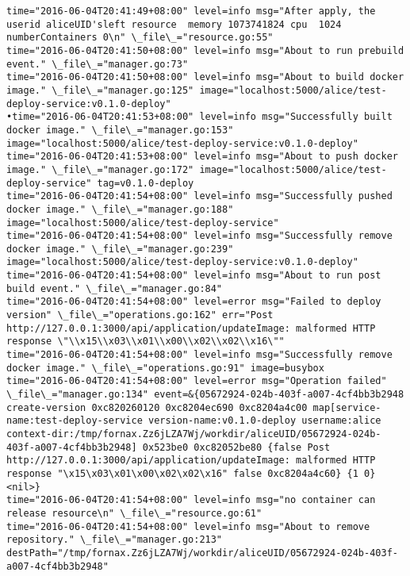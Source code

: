 \begin{lstlisting}[caption={Fornax功能性测试日志}]
time="2016-06-04T20:41:49+08:00" level=info msg="After apply, the userid aliceUID'sleft resource  memory 1073741824 cpu  1024 numberContainers 0\n" \_file\_="resource.go:55" 
time="2016-06-04T20:41:50+08:00" level=info msg="About to run prebuild event." \_file\_="manager.go:73" 
time="2016-06-04T20:41:50+08:00" level=info msg="About to build docker image." \_file\_="manager.go:125" image="localhost:5000/alice/test-deploy-service:v0.1.0-deploy" 
•time="2016-06-04T20:41:53+08:00" level=info msg="Successfully built docker image." \_file\_="manager.go:153" image="localhost:5000/alice/test-deploy-service:v0.1.0-deploy" 
time="2016-06-04T20:41:53+08:00" level=info msg="About to push docker image." \_file\_="manager.go:172" image="localhost:5000/alice/test-deploy-service" tag=v0.1.0-deploy 
time="2016-06-04T20:41:54+08:00" level=info msg="Successfully pushed docker image." \_file\_="manager.go:188" image="localhost:5000/alice/test-deploy-service" 
time="2016-06-04T20:41:54+08:00" level=info msg="Successfully remove docker image." \_file\_="manager.go:239" image="localhost:5000/alice/test-deploy-service:v0.1.0-deploy" 
time="2016-06-04T20:41:54+08:00" level=info msg="About to run post build event." \_file\_="manager.go:84" 
time="2016-06-04T20:41:54+08:00" level=error msg="Failed to deploy version" \_file\_="operations.go:162" err="Post http://127.0.0.1:3000/api/application/updateImage: malformed HTTP response \"\\x15\\x03\\x01\\x00\\x02\\x02\\x16\"" 
time="2016-06-04T20:41:54+08:00" level=info msg="Successfully remove docker image." \_file\_="operations.go:91" image=busybox 
time="2016-06-04T20:41:54+08:00" level=error msg="Operation failed" \_file\_="manager.go:134" event=&{05672924-024b-403f-a007-4cf4bb3b2948 create-version 0xc820260120 0xc8204ec690 0xc8204a4c00 map[service-name:test-deploy-service version-name:v0.1.0-deploy username:alice context-dir:/tmp/fornax.Zz6jLZA7Wj/workdir/aliceUID/05672924-024b-403f-a007-4cf4bb3b2948] 0x523be0 0xc82052be80 {false Post http://127.0.0.1:3000/api/application/updateImage: malformed HTTP response "\x15\x03\x01\x00\x02\x02\x16" false 0xc8204a4c60} {1 0} <nil>} 
time="2016-06-04T20:41:54+08:00" level=info msg="no container can release resource\n" \_file\_="resource.go:61" 
time="2016-06-04T20:41:54+08:00" level=info msg="About to remove repository." \_file\_="manager.go:213" destPath="/tmp/fornax.Zz6jLZA7Wj/workdir/aliceUID/05672924-024b-403f-a007-4cf4bb3b2948" 

\end{lstlisting}

